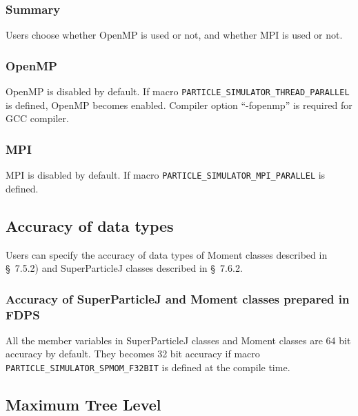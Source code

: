 \subsubsection{Summary}

Users choose whether OpenMP is used or not, and whether MPI is used or not.

\subsubsection{OpenMP}

OpenMP is disabled by default. If macro
\texttt{PARTICLE\_SIMULATOR\_THREAD\_PARALLEL} is defined, OpenMP becomes
enabled. Compiler option ``-fopenmp'' is required for GCC compiler.

\subsubsection{MPI}

MPI is disabled by default. If macro
\texttt{PARTICLE\_SIMULATOR\_MPI\_PARALLEL} is defined.

\subsection{Accuracy of data types}


Users can specify the accuracy of data types of Moment classes described in \S~7.5.2) and SuperParticleJ classes described in \S~7.6.2.

\subsubsection{Accuracy of SuperParticleJ and Moment classes prepared in FDPS}
All the member variables in SuperParticleJ classes and Moment classes
are 64 bit accuracy by default. They becomes 32 bit accuracy if macro
\texttt{PARTICLE\_SIMULATOR\_SPMOM\_F32BIT} is defined at the compile
time.

\subsection{Maximum Tree Level}
\label{sec:compile_tree_level}


